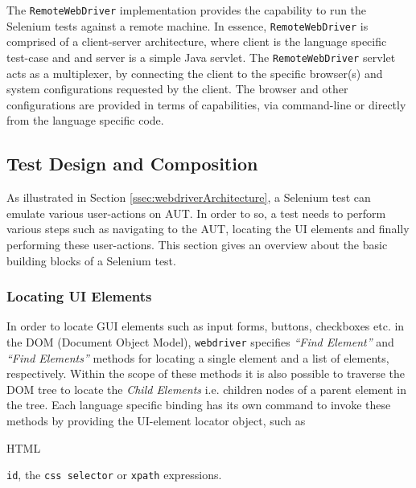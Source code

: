 The \texttt{RemoteWebDriver} implementation provides the capability to run the Selenium tests against a remote machine. In essence, \texttt{RemoteWebDriver} is comprised of a client-server architecture, where client is the language specific test-case and and server is a simple Java servlet. The \texttt{RemoteWebDriver} servlet acts as a multiplexer, by connecting the client to the specific browser(s) and system configurations requested by the client. The browser and other configurations are provided in terms of capabilities, via command-line or directly from the language specific code.
\subsection{Test Design and Composition}
\label{testDesignPractices}
As illustrated in Section \ref{ssec:webdriverArchitecture}, a Selenium test can emulate various user-actions on AUT. In order to so, a test needs to perform various steps such as navigating to the AUT, locating the UI elements and finally performing these user-actions. This section gives an overview about the basic building blocks of a Selenium test. 
\subsubsection{Locating UI Elements}
\label{sssec:locatingUIElements}
In order to locate GUI elements such as input forms, buttons, checkboxes etc. in the DOM (Document Object Model), \texttt{webdriver} specifies \textit{``Find Element''} and \textit{``Find Elements''} methods for locating a single element and a list of elements, respectively. 
Within the scope of these methods it is also possible to traverse the DOM tree to locate the \textit{Child Elements} i.e. children nodes of a parent element in the tree. 
Each language specific binding has its own command to invoke these methods by providing the UI-element locator object, such as\begin{small} HTML\end{small} \texttt{id}, the \texttt{css selector} or \texttt{xpath} expressions.


